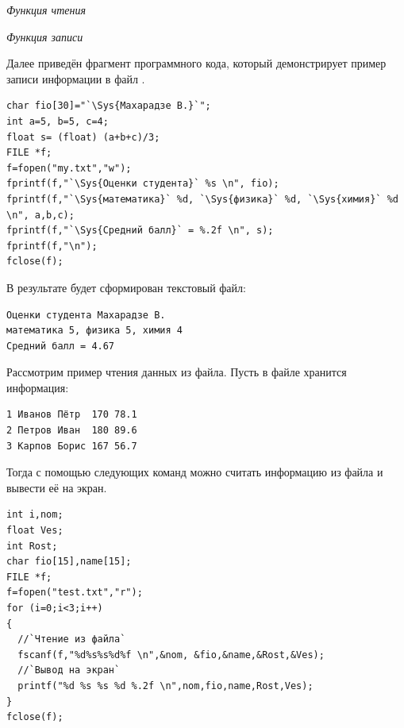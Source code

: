 \emph{Функция чтения}


\emph{Функция записи}


Далее приведён фрагмент программного кода, который демонстрирует пример записи информации в файл
.
\begin{lstlisting}
char fio[30]="`\Sys{Махарадзе В.}`";
int a=5, b=5, c=4;
float s= (float) (a+b+c)/3;
FILE *f;
f=fopen("my.txt","w");
fprintf(f,"`\Sys{Оценки студента}` %s \n", fio);
fprintf(f,"`\Sys{математика}` %d, `\Sys{физика}` %d, `\Sys{химия}` %d \n", a,b,c);
fprintf(f,"`\Sys{Средний балл}` = %.2f \n", s);
fprintf(f,"\n");
fclose(f);
\end{lstlisting}

В результате будет сформирован текстовый файл:
\begin{verbatim}
Оценки студента Махарадзе В.
математика 5, физика 5, химия 4
Средний балл = 4.67
\end{verbatim}

Рассмотрим пример чтения данных из файла. Пусть в файле  хранится информация:
\begin{verbatim}
1 Иванов Пётр  170 78.1
2 Петров Иван  180 89.6
3 Карпов Борис 167 56.7
\end{verbatim}

Тогда с помощью следующих команд можно считать информацию из файла и вывести её на экран.
\begin{lstlisting}
int i,nom;
float Ves;
int Rost;
char fio[15],name[15];
FILE *f;	
f=fopen("test.txt","r");
for (i=0;i<3;i++)
{
  //`Чтение из файла`
  fscanf(f,"%d%s%s%d%f \n",&nom, &fio,&name,&Rost,&Ves);
  //`Вывод на экран`
  printf("%d %s %s %d %.2f \n",nom,fio,name,Rost,Ves);
}
fclose(f);
\end{lstlisting}

